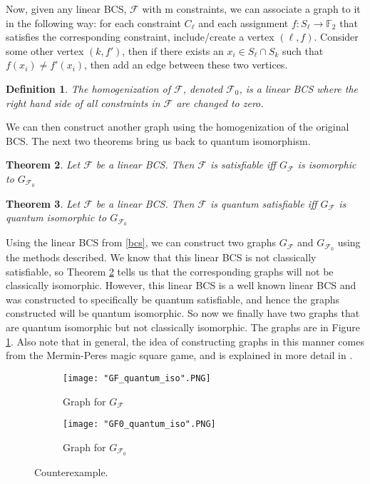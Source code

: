 \documentclass[12pt]{article}
\newtheorem{thm}{Theorem}[section]
\newtheorem{defn}[thm]{Definition}
\begin{document}
Now, given any linear BCS, $\mathcal{F}$ with m constraints, we can
associate a graph to it in the following way: for each constraint
$C_{\ell}$ and each assignment $f:S_{\ell} \rightarrow \mathbb{F}_2$
that satisfies the corresponding constraint, include/create a vertex
$(\ell, f)$. Consider some other vertex $(k, f')$, then if there
exists an $x_i \in S_{\ell} \cap S_{k}$ such that $f(x_i) \neq
f'(x_i)$, then add an edge between these two vertices.

\begin{defn}
  The homogenization of $\mathcal{F}$, denoted $\mathcal{F}_0$, is a
  linear BCS where the right hand side of all constraints in
  $\mathcal{F}$ are changed to zero.
\end{defn}

We can then construct another graph using the homogenization of the
original BCS. The next two theorems bring us back to quantum
isomorphism.

\begin{thm}
  \label{classicalBCS}
  Let $\mathcal{F}$ be a linear BCS. Then $\mathcal{F}$ is satisfiable
  iff $G_{\mathcal{F}}$ is isomorphic to $G_{\mathcal{F}_0}$
\end{thm}

\begin{thm}
  \label{quantumBCS}
  Let $\mathcal{F}$ be a linear BCS. Then $\mathcal{F}$ is quantum
  satisfiable iff $G_{\mathcal{F}}$ is quantum isomorphic to
  $G_{\mathcal{F}_0}$
\end{thm}

Using the linear BCS from \ref{bcs}, we can construct two graphs
$G_{\mathcal{F}}$ and $G_{\mathcal{F}_0}$ using the methods
described. We know that this linear BCS is not classically
satisfiable, so Theorem \ref{classicalBCS} tells us that the
corresponding graphs will not be classically isomorphic. However, this
linear BCS is a well known linear BCS and was constructed to
specifically be quantum satisfiable, and hence the graphs constructed
will be quantum isomorphic. So now we finally have two graphs that are
quantum isomorphic but not classically isomorphic. The graphs are in
Figure \ref{fig:qisoNOTiso}. Also note that in general, the idea of
constructing graphs in this manner comes from the Mermin-Peres magic
square game, and is explained in more detail in \cite{QuantumMagic}.

\begin{figure}
\centering
  \begin{subfigure}[b]{0.4\textwidth}
    \texttt{[image: "GF\_quantum\_iso".PNG]}
    \caption{Graph for $G_{\mathcal{F}}$}
  \end{subfigure}
  \begin{subfigure}[b]{0.4\textwidth}
    \texttt{[image: "GF0\_quantum\_iso".PNG]}
    \caption{Graph for $G_{\mathcal{F}_0}$}
  \end{subfigure}
\caption{Counterexample.}
\label{fig:qisoNOTiso}
\end{figure}
\end{document}
